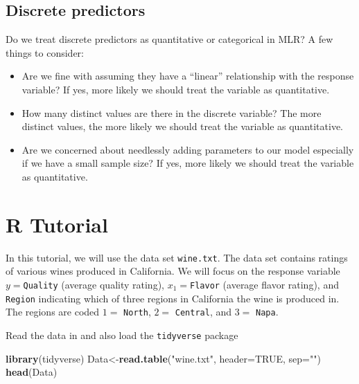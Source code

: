\documentclass[
]{book}
\newenvironment{Shaded}{\begin{snugshade}}{\end{snugshade}}
\newcommand{\AttributeTok}[1]{\textcolor[rgb]{0.13,0.29,0.53}{#1}}
\newcommand{\ConstantTok}[1]{\textcolor[rgb]{0.56,0.35,0.01}{#1}}
\newcommand{\FunctionTok}[1]{\textcolor[rgb]{0.13,0.29,0.53}{\textbf{#1}}}
\newcommand{\NormalTok}[1]{#1}
\newcommand{\OtherTok}[1]{\textcolor[rgb]{0.56,0.35,0.01}{#1}}
\newcommand{\StringTok}[1]{\textcolor[rgb]{0.31,0.60,0.02}{#1}}
\providecommand{\tightlist}{%
  \setlength{\itemsep}{0pt}\setlength{\parskip}{0pt}}
\begin{document}
\hypertarget{discrete-predictors}{%
\subsection{Discrete predictors}\label{discrete-predictors}}

Do we treat discrete predictors as quantitative or categorical in MLR? A few things to consider:

\begin{itemize}
\tightlist
\item
  Are we fine with assuming they have a ``linear'' relationship with the response variable? If yes, more likely we should treat the variable as quantitative.
\item
  How many distinct values are there in the discrete variable? The more distinct values, the more likely we should treat the variable as quantitative.
\item
  Are we concerned about needlessly adding parameters to our model especially if we have a small sample size? If yes, more likely we should treat the variable as quantitative.
\end{itemize}

\hypertarget{r-tutorial-5}{%
\section{R Tutorial}\label{r-tutorial-5}}

In this tutorial, we will use the data set \texttt{wine.txt}. The data set contains ratings of various wines produced in California. We will focus on the response variable \(y=\)\texttt{Quality} (average quality rating), \(x_1=\)\texttt{Flavor} (average flavor rating), and \texttt{Region} indicating which of three regions in California the wine is produced in. The regions are coded \(1=\) \texttt{North}, \(2=\) \texttt{Central}, and \(3=\) \texttt{Napa}.

Read the data in and also load the \texttt{tidyverse} package

\begin{Shaded}
\begin{Highlighting}[]
\FunctionTok{library}\NormalTok{(tidyverse)}
\NormalTok{Data}\OtherTok{\textless{}{-}}\FunctionTok{read.table}\NormalTok{(}\StringTok{"wine.txt"}\NormalTok{, }\AttributeTok{header=}\ConstantTok{TRUE}\NormalTok{, }\AttributeTok{sep=}\StringTok{""}\NormalTok{)}
\FunctionTok{head}\NormalTok{(Data)}
\end{Highlighting}
\end{Shaded}
\end{document}
